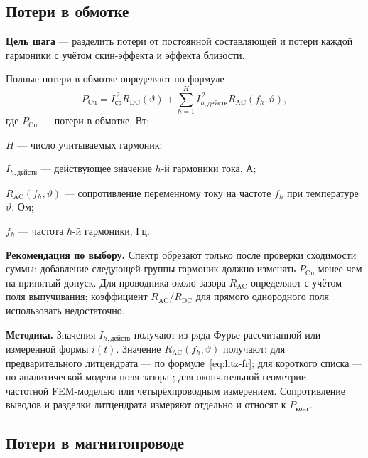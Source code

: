 \documentclass[14pt,a4paper]{extarticle}
\newcommand{\method}{\par\noindent\textbf{Методика.} }
\newcommand{\recommend}{\par\noindent\textbf{Рекомендация по выбору.} }
\begin{document}
\subsection{Потери в обмотке}

\textbf{Цель шага} --- разделить потери от постоянной составляющей и
потери каждой гармоники с учётом скин-эффекта и эффекта близости.

Полные потери в обмотке определяют по формуле
\begin{equation}
 P_{\text{Cu}}=
 I_{\text{ср}}^{\,2}R_{\text{DC}}(\vartheta)
 +\sum_{h=1}^{H}
 I_{h,\text{действ}}^{\,2}
 R_{\text{AC}}(f_h,\vartheta),
 \label{eq:copper-loss-harmonic}
\end{equation}
где $P_{\text{Cu}}$ --- потери в обмотке, Вт;\par\noindent
$H$ --- число учитываемых гармоник;\par\noindent
$I_{h,\text{действ}}$ --- действующее значение $h$-й гармоники тока, А;\par\noindent
$R_{\text{AC}}(f_h,\vartheta)$ --- сопротивление переменному току на
частоте $f_h$ при температуре $\vartheta$, Ом;\par\noindent
$f_h$ --- частота $h$-й гармоники, Гц.

\recommend Спектр обрезают только после проверки сходимости суммы:
добавление следующей группы гармоник должно изменять $P_{\text{Cu}}$
менее чем на принятый допуск. Для проводника около зазора
$R_{\text{AC}}$ определяют с учётом поля выпучивания; коэффициент
$R_{\text{AC}}/R_{\text{DC}}$ для прямого однородного поля использовать
недостаточно.

\method Значения $I_{h,\text{действ}}$ получают из ряда Фурье рассчитанной
или измеренной формы $i(t)$. Значение $R_{\text{AC}}(f_h,\vartheta)$ получают:
для предварительного литцендрата --- по формуле~\eqref{eq:litz-fr}; для
короткого списка --- по аналитической модели поля зазора
\cite{ewald_litz,meng}; для окончательной геометрии --- частотной FEM-моделью
или четырёхпроводным измерением. Сопротивление выводов и разделки
литцендрата измеряют отдельно и относят к $P_{\text{конт}}$.

\subsection{Потери в магнитопроводе}
\end{document}

